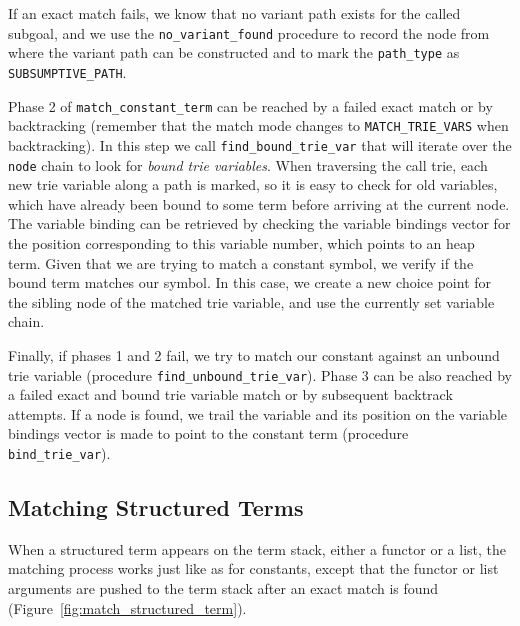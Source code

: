 If an exact match fails, we know that no variant path exists for the called subgoal, and we use the
\texttt{no\_variant\_found} procedure to record the node from where the variant path can be
constructed and to mark the \texttt{path\_type} as \texttt{SUBSUMPTIVE\_PATH}.

Phase 2 of \texttt{match\_constant\_term} can be reached by a failed exact match or by backtracking
(remember that the match mode changes to \texttt{MATCH\_TRIE\_VARS} when backtracking). In this step
we call \texttt{find\_bound\_trie\_var} that will iterate over the \texttt{node} chain to look for
\textit{bound trie variables}. When traversing the call trie, each new trie variable
along a path is marked, so it is easy to check for old variables, which have already been bound
to some term before arriving at the current node. The variable binding can be retrieved by
checking the variable bindings vector for the position corresponding to this variable
number, which points to an heap term. Given that we are trying to match a constant symbol,
we verify if the bound term matches our symbol. In this case, we create a new choice point
for the sibling node of the matched trie variable, and use the currently set variable chain.

Finally, if phases 1 and 2 fail, we try to match our constant against an unbound trie variable
(procedure \texttt{find\_unbound\_trie\_var}).
Phase 3 can be also reached by a failed exact and bound trie variable match or by subsequent backtrack
attempts. If a node is found, we trail the variable and its position on the variable bindings
vector is made to point to the constant term (procedure \texttt{bind\_trie\_var}).

\subsection{Matching Structured Terms}

When a structured term appears on the term stack, either a functor or a list, the matching
process works just like as for constants, except that the functor or list arguments are
pushed to the term stack after an exact match is found (Figure~\ref{fig:match_structured_term}).

